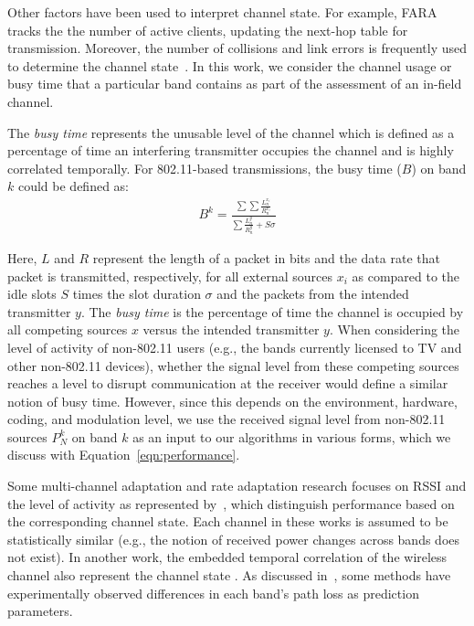Other factors have been used to interpret channel state. For example,
FARA tracks the the number of active clients, updating the next-hop table 
for transmission\cite{rahul2009frequency}. Moreover, the number of collisions
and link errors is frequently used to determine the channel 
state~\cite{pang2005rate}. In this work, we consider the channel usage
or busy time that a particular band contains as part of the assessment
of an in-field channel.


The \emph{busy time} represents the unusable level of the channel
which is defined as a percentage of time an interfering transmitter 
occupies the channel and is highly correlated temporally. For 802.11-based
transmissions, the busy time ($B$) on band $k$ could be defined as:
\begin{align}
\label{eqn:80211activity}
B^k = \frac{\sum{\sum{\frac{L_n^{x_i}}{R_n^{x_i}}}}}{\sum{\frac{L_n^y}{R_n^y}}+S \sigma}
\end{align}

Here, $L$ and $R$ represent the length of a packet in bits and the data
rate that packet is transmitted, respectively, for all external sources $x_i$
as compared to the idle slots $S$ times the slot duration $\sigma$ and
the packets from the intended transmitter $y$. The \emph{busy time} is 
the percentage of time the channel is occupied by all competing sources 
$x$ versus the intended transmitter $y$. When considering the level of
activity of non-802.11 users (e.g., the bands currently licensed to TV 
and other non-802.11 devices), whether the signal level from these
competing sources reaches a level to disrupt communication at the receiver
would define a similar notion of busy time.  However, since this depends
on the environment, hardware, coding, and modulation level, we use
the received signal level from non-802.11 sources $P_N^k$ on band $k$
as an input to our algorithms in various forms, which we discuss with 
Equation~\ref{eqn:performance}.

Some multi-channel adaptation and rate adaptation research focuses on RSSI 
and the level of activity as represented by~\cite{cordeiro2007c,MOAR},
which distinguish performance based on the corresponding channel state.
Each channel in these works is assumed to be statistically similar (e.g.,
the notion of received power changes across bands does not exist).
In another work, the embedded temporal correlation of the wireless 
channel also represent the channel state \cite{liuastra}. As discussed
in~\cite{yucek2009survey}, some methods have experimentally observed 
differences in each band's path loss as prediction parameters.


